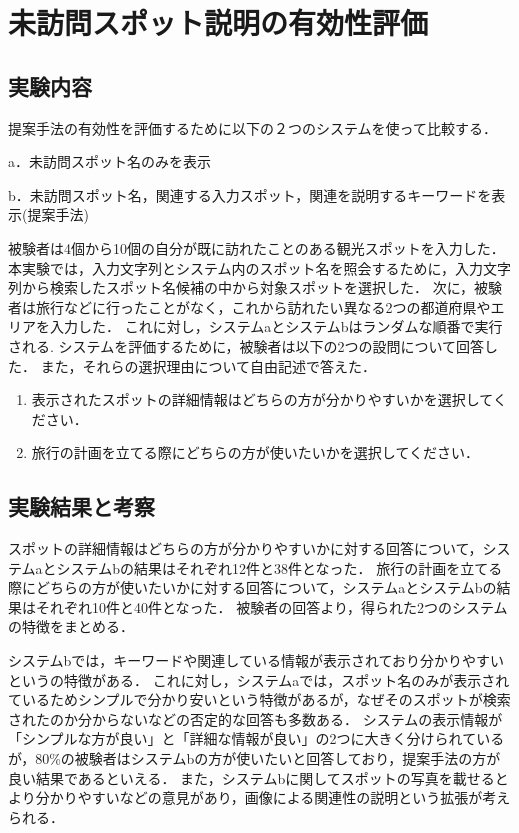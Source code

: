 \documentclass[submit,techrep,noauthor]{ipsj}
\begin{document}
\section{未訪問スポット説明の有効性評価}
\label{sec:未訪問スポット説明の有効性評価}
\subsection{実験内容}
提案手法の有効性を評価するために以下の２つのシステムを使って比較する．
\begin{description}
  \item a．未訪問スポット名のみを表示
  \item b．未訪問スポット名，関連する入力スポット，関連を説明するキーワードを表示(提案手法)
\end{description}

被験者は4個から10個の自分が既に訪れたことのある観光スポットを入力した．
本実験では，入力文字列とシステム内のスポット名を照会するために，入力文字列から検索したスポット名候補の中から対象スポットを選択した．
次に，被験者は旅行などに行ったことがなく，これから訪れたい異なる2つの都道府県やエリアを入力した．
これに対し，システムaとシステムbはランダムな順番で実行される.
システムを評価するために，被験者は以下の2つの設問について回答した．
また，それらの選択理由について自由記述で答えた．
\begin{enumerate}
  \item 表示されたスポットの詳細情報はどちらの方が分かりやすいかを選択してください．
  \item 旅行の計画を立てる際にどちらの方が使いたいかを選択してください．
\end{enumerate}

\subsection{実験結果と考察}
スポットの詳細情報はどちらの方が分かりやすいかに対する回答について，システムaとシステムbの結果はそれぞれ12件と38件となった．
旅行の計画を立てる際にどちらの方が使いたいかに対する回答について，システムaとシステムbの結果はそれぞれ10件と40件となった．
被験者の回答より，得られた2つのシステムの特徴をまとめる．

システムbでは，キーワードや関連している情報が表示されており分かりやすいというの特徴がある．
これに対し，システムaでは，スポット名のみが表示されているためシンプルで分かり安いという特徴があるが，なぜそのスポットが検索されたのか分からないなどの否定的な回答も多数ある．
システムの表示情報が「シンプルな方が良い」と「詳細な情報が良い」の2つに大きく分けられているが，80\%の被験者はシステムbの方が使いたいと回答しており，提案手法の方が良い結果であるといえる．
また，システムbに関してスポットの写真を載せるとより分かりやすいなどの意見があり，画像による関連性の説明という拡張が考えられる．
\end{document}
